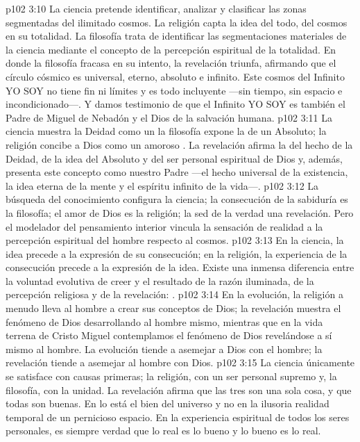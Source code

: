 \vs p102 3:10 \pc La ciencia pretende identificar, analizar y clasificar las zonas segmentadas del ilimitado cosmos. La religión capta la idea del todo, del cosmos en su totalidad. La filosofía trata de identificar las segmentaciones materiales de la ciencia mediante el concepto de la percepción espiritual de la totalidad. En donde la filosofía fracasa en su intento, la revelación triunfa, afirmando que el círculo cósmico es universal, eterno, absoluto e infinito. Este cosmos del Infinito YO SOY no tiene fin ni límites y es todo incluyente ---sin tiempo, sin espacio e incondicionado---. Y damos testimonio de que el Infinito YO SOY es también el Padre de Miguel de Nebadón y el Dios de la salvación humana.
\vs p102 3:11 La ciencia muestra la Deidad como un  la filosofía expone la  de un Absoluto; la religión concibe a Dios como un amoroso . La revelación afirma la  del hecho de la Deidad, de la idea del Absoluto y del ser personal espiritual de Dios y, además, presenta este concepto como nuestro Padre ---el hecho universal de la existencia, la idea eterna de la mente y el espíritu infinito de la vida---.
\vs p102 3:12 La búsqueda del conocimiento configura la ciencia; la consecución de la sabiduría es la filosofía; el amor de Dios es la religión; la sed de la verdad  una revelación. Pero el modelador del pensamiento interior vincula la sensación de realidad a la percepción espiritual del hombre respecto al cosmos.
\vs p102 3:13 \pc En la ciencia, la idea precede a la expresión de su consecución; en la religión, la experiencia de la consecución precede a la expresión de la idea. Existe una inmensa diferencia entre la voluntad evolutiva de creer y el resultado de la razón iluminada, de la percepción religiosa y de la revelación: .
\vs p102 3:14 En la evolución, la religión a menudo lleva al hombre a crear sus conceptos de Dios; la revelación muestra el fenómeno de Dios desarrollando al hombre mismo, mientras que en la vida terrena de Cristo Miguel contemplamos el fenómeno de Dios revelándose a sí mismo al hombre. La evolución tiende a asemejar a Dios con el hombre; la revelación tiende a asemejar al hombre con Dios.
\vs p102 3:15 La ciencia únicamente se satisface con causas primeras; la religión, con un ser personal supremo y, la filosofía, con la unidad. La revelación afirma que las tres son una sola cosa, y que todas son buenas. En lo  está el bien del universo y no en la ilusoria realidad temporal de un pernicioso espacio. En la experiencia espiritual de todos los seres personales, es siempre verdad que lo real es lo bueno y lo bueno es lo real.
